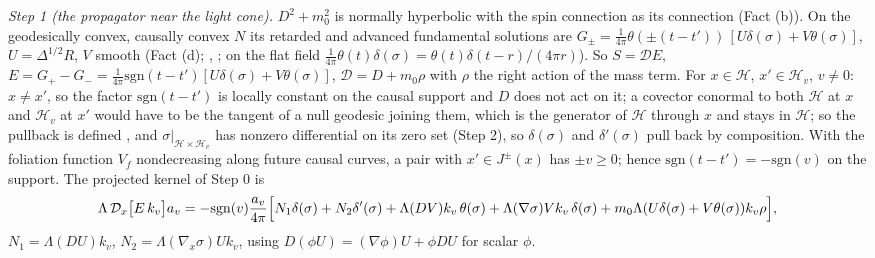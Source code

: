 \emph{Step 1 (the propagator near the light cone).} $D^{2} + m_{0}^{2}$ is normally hyperbolic with the spin connection as its connection (Fact (b)). On the geodesically convex, causally convex $N$ its retarded and advanced fundamental solutions are $G_{\pm} = \tfrac{1}{4\pi}\theta(\pm(t - t'))\,[U\delta(\sigma) + V\theta(\sigma)]$, $U = \Delta^{1/2}R$, $V$ smooth (Fact (d); \cite{Friedlander1975}, \cite[Ch.~2]{BarGinouxPfaffle2007}; on the flat field $\tfrac{1}{4\pi}\theta(t)\delta(\sigma) = \theta(t)\delta(t - r)/(4\pi r)$). So $S = \mathcal{D}E$, $E = G_{+} - G_{-} = \tfrac{1}{4\pi}\mathrm{sgn}(t - t')[U\delta(\sigma) + V\theta(\sigma)]$, $\mathcal{D} = D + m_{0}\rho$ with $\rho$ the right action of the mass term. For $x \in \mathcal{H}$, $x' \in \mathcal{H}_{v}$, $v \neq 0$: $x \neq x'$, so the factor $\mathrm{sgn}(t - t')$ is locally constant on the causal support and $D$ does not act on it; a covector conormal to both $\mathcal{H}$ at $x$ and $\mathcal{H}_{v}$ at $x'$ would have to be the tangent of a null geodesic joining them, which is the generator of $\mathcal{H}$ through $x$ and stays in $\mathcal{H}$; so the pullback is defined \cite[Thm.~8.2.4]{Hormander1983}, and $\sigma|_{\mathcal{H}\times\mathcal{H}_{v}}$ has nonzero differential on its zero set (Step 2), so $\delta(\sigma)$ and $\delta'(\sigma)$ pull back by composition. With the foliation function $V_{f}$ nondecreasing along future causal curves, a pair with $x' \in J^{\pm}(x)$ has $\pm v \ge 0$; hence $\mathrm{sgn}(t - t') = -\mathrm{sgn}(v)$ on the support. The projected kernel of Step 0 is
\[
\Lambda\,\mathcal{D}_{x}\bigl[E\,k_{v}\bigr]a_{v} = -\mathrm{sgn}(v)\frac{a_{v}}{4\pi}\Bigl[N_{1}\delta(\sigma) + N_{2}\delta'(\sigma) + \Lambda(DV)k_{v}\,\theta(\sigma) + \Lambda(\nabla\sigma)Vk_{v}\,\delta(\sigma) + m_{0}\Lambda(U\delta(\sigma) + V\theta(\sigma))k_{v}\rho\Bigr],
\]
$N_{1} = \Lambda(DU)k_{v}$, $N_{2} = \Lambda(\nabla_{x}\sigma)Uk_{v}$, using $D(\phi U) = (\nabla\phi)U + \phi DU$ for scalar $\phi$.

